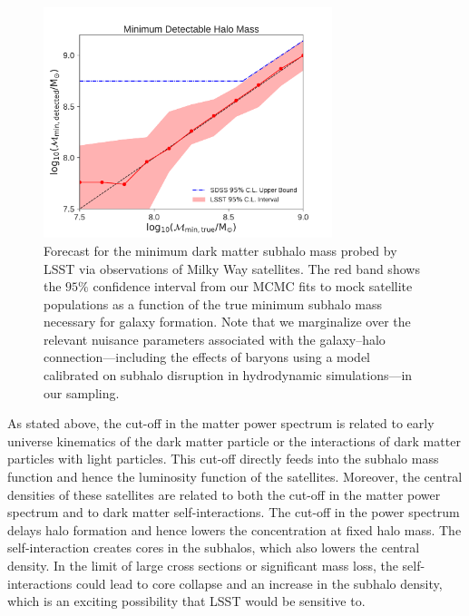 \documentclass[modern,linenumbers]{aastex62}
\begin{document}
\begin{figure}
\centering
\includegraphics[width=0.75\textwidth]{figures/LSST_Mmin.pdf}
\caption{Forecast for the minimum dark matter subhalo mass probed by LSST via observations of Milky Way satellites. The red band shows the $95\%$ confidence interval from our MCMC fits to mock satellite populations as a function of the true minimum subhalo mass necessary for galaxy formation. Note that we marginalize over the relevant nuisance parameters associated with the galaxy--halo connection---including the effects of baryons using a model calibrated on subhalo disruption in hydrodynamic simulations---in our sampling.}\label{fig:satellite_mmin}
\end{figure}

\vspace{1em} 


As stated above, the cut-off in the matter power spectrum is related to early universe kinematics of the dark matter particle or the interactions of dark matter particles with light particles. This cut-off directly feeds into the subhalo mass function and hence the luminosity function of the satellites. Moreover, the central densities of these satellites are related to both the cut-off in the matter power spectrum and to dark matter self-interactions. The cut-off in the power spectrum delays halo formation and hence lowers the concentration at fixed halo mass. The self-interaction creates cores in the subhalos, which also lowers the central density. In the limit of large cross sections or significant mass loss, the self-interactions could lead to core collapse and an increase in the subhalo density, which is an exciting possibility that LSST would be sensitive to.
\end{document}
